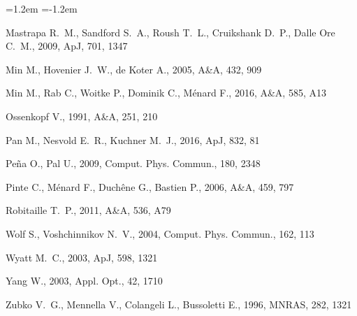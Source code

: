 \documentclass[11pt,a4paper]{article}
\begin{document}
\begin{list}{}{\leftmargin=1.2em \itemindent=-1.2em \itemsep=1pt}
\item Mastrapa R.~M., Sandford S.~A., Roush T.~L., Cruikshank D.~P., Dalle Ore C.~M., 2009, ApJ, 701, 1347
\item Min M., Hovenier J.~W., de Koter A., 2005, A\&A, 432, 909
\item Min M., Rab C., Woitke P., Dominik C., M\'enard F., 2016, A\&A, 585, A13
\item Ossenkopf V., 1991, A\&A, 251, 210
\item Pan M., Nesvold E.~R., Kuchner M.~J., 2016, ApJ, 832, 81
\item Pe\~na O., Pal U., 2009, Comput. Phys. Commun., 180, 2348
\item Pinte C., M\'enard F., Duch\^ene G., Bastien P., 2006, A\&A, 459, 797
\item Robitaille T.~P., 2011, A\&A, 536, A79
\item Wolf S., Voshchinnikov N.~V., 2004, Comput. Phys. Commun., 162, 113
\item Wyatt M.~C., 2003, ApJ, 598, 1321
\item Yang W., 2003, Appl. Opt., 42, 1710
\item Zubko V.~G., Mennella V., Colangeli L., Bussoletti E., 1996, MNRAS, 282, 1321
\end{list}
\end{document}
